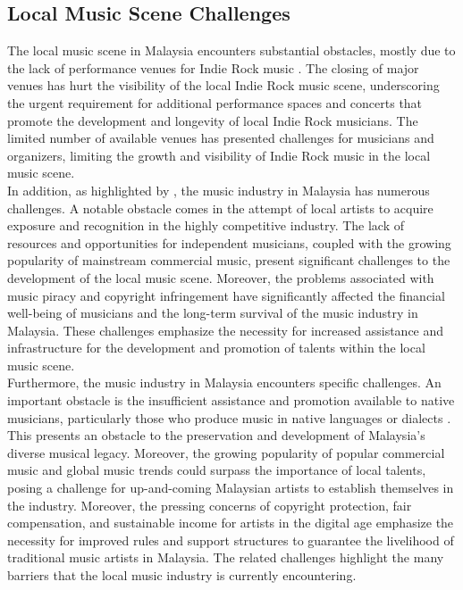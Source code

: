 \subsection{Local Music Scene Challenges}
The local music scene in Malaysia encounters substantial obstacles, mostly due to the lack of performance venues for Indie Rock music \parencite{ong19}. The closing of major venues has hurt the visibility of the local Indie Rock music scene, underscoring the urgent requirement for additional performance spaces and concerts that promote the development and longevity of local Indie Rock musicians. The limited number of available venues has presented challenges for musicians and organizers, limiting the growth and visibility of Indie Rock music in the local music scene. \\

In addition, as highlighted by \textcite{mohd21}, the music industry in Malaysia has numerous challenges. A notable obstacle comes in the attempt of local artists to acquire exposure and recognition in the highly competitive industry. The lack of resources and opportunities for independent musicians, coupled with the growing popularity of mainstream commercial music, present significant challenges to the development of the local music scene. Moreover, the problems associated with music piracy and copyright infringement have significantly affected the financial well-being of musicians and the long-term survival of the music industry in Malaysia. These challenges emphasize the necessity for increased assistance and infrastructure for the development and promotion of talents within the local music scene. \\

Furthermore, the music industry in Malaysia encounters specific challenges. An important obstacle is the insufficient assistance and promotion available to native musicians, particularly those who produce music in native languages or dialects \parencite{silahudin19}. This presents an obstacle to the preservation and development of Malaysia's diverse musical legacy. Moreover, the growing popularity of popular commercial music and global music trends could surpass the importance of local talents, posing a challenge for up-and-coming Malaysian artists to establish themselves in the industry. Moreover, the pressing concerns of copyright protection, fair compensation, and sustainable income for artists in the digital age emphasize the necessity for improved rules and support structures to guarantee the livelihood of traditional music artists in Malaysia. The related challenges highlight the many barriers that the local music industry is currently encountering.


